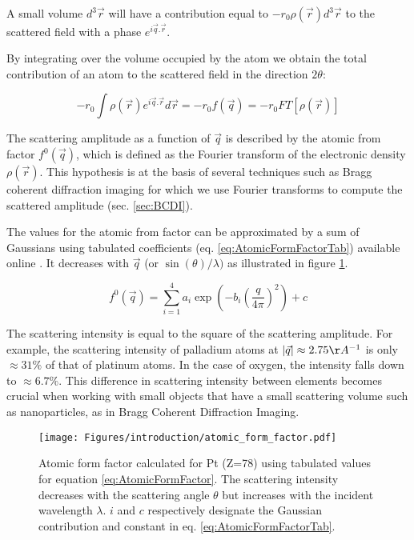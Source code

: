 A small volume $d^3\vec{r}$ will have a contribution equal to $-r_0 \rho(\vec{r})d^3\vec{r}$ to the scattered field with a phase $e^{i\vec{q}.\vec{r}}$.

By integrating over the volume occupied by the atom we obtain the total contribution of an atom to the scattered field in the direction $2\theta$:

\begin{equation}
    \label{eq:AtomicFormFactor}
    -r_0 \int \rho (\vec{r}) e^{i\vec{q}.\vec{r}} d\vec{r} = -r_0 f(\vec{q}) = -r_0 FT [\rho (\vec{r})]
\end{equation}

The scattering amplitude as a function of $\vec{q}$ is described by the atomic from factor $f^0(\vec{q})$, which is defined as the Fourier transform of the electronic density $\rho(\vec{r})$.
This hypothesis is at the basis of several techniques such as Bragg coherent diffraction imaging for which we use Fourier transforms to compute the scattered amplitude (sec. \ref{sec:BCDI}).

The values for the atomic from factor can be approximated by a sum of Gaussians using tabulated coefficients (eq. \ref{eq:AtomicFormFactorTab}) available online \parencite{InterTablesOfCryst}.
It decreases with $\vec{q}$ (or $\sin(\theta) / \lambda)$ as illustrated in figure \ref{fig:atomic_form_factor}.

\begin{equation}
    \label{eq:AtomicFormFactorTab}
    f^0(\vec{q}) = \sum_{i=1}^4 a_i \exp (-b_i (\frac{q} {4\pi})^2) + c
\end{equation}

The scattering intensity is equal to the square of the scattering amplitude.
For example, the scattering intensity of palladium atoms at $|\vec{q}| \approx 2.75 \AA^{-1}$ is only $\approx 31\%$ of that of platinum atoms. In the case of oxygen, the intensity falls down to $\approx 6.7\%$.
This difference in scattering intensity between elements becomes crucial when working with small objects that have a small scattering volume such as nanoparticles, as in Bragg Coherent Diffraction Imaging.

\begin{figure}[!htb]
    \centering
    \texttt{[image: Figures/introduction/atomic\_form\_factor.pdf]}
    \caption{
    Atomic form factor calculated for Pt (Z=78) using tabulated values \parencite{InterTablesOfCryst} for equation \ref{eq:AtomicFormFactor}. The scattering intensity decreases with the scattering angle $\theta$ but increases with the incident wavelength $\lambda$. $i$ and $c$ respectively designate the Gaussian contribution and constant in eq. \ref{eq:AtomicFormFactorTab}.
    }
    \label{fig:atomic_form_factor}
\end{figure}


